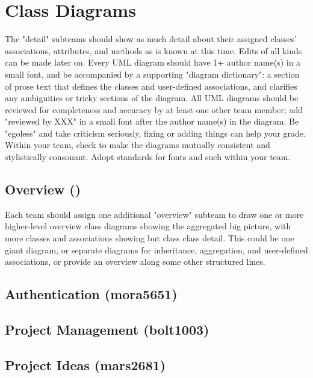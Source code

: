 \documentclass[11pt]{report}
\begin{document}
\chapter{Class Diagrams}
The "detail" subteams should show as much detail about their assigned classes' associations, attributes, and methods as is known at this time. Edits of all kinds can be made later on.
Every UML diagram should have 1+ author name(s) in a small font, and be accompanied by a supporting "diagram dictionary": a section of prose text that defines the classes and user-defined associations, and clarifies any ambiguities or tricky sections of the diagram. All UML diagrams should be reviewed for completeness and accuracy by at least one other team member; add "reviewed by XXX" in a small font after the author name(s) in the diagram. Be "egoless" and take criticism seriously, fixing or adding things can help your grade. Within your team, check to make the diagrams mutually consistent and stylistically consonant. Adopt standards for fonts and such within your team.



\section{Overview ()}
Each team should assign one additional "overview" subteam to draw one or more higher-level overview class diagrams showing the aggregated big picture, with more classes and associations showing but class class detail. This could be one giant diagram, or separate diagrams for inheritance, aggregation, and user-defined associations, or provide an overview along some other structured lines.



\section{Authentication (mora5651)}



\section{Project Management (bolt1003)}



\section{Project Ideas (mars2681)}
\end{document}
